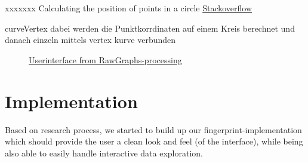 \documentclass[runningheads]{llncs}
\begin{document}
xxxxxxx
Calculating the position of points in a circle
\href{https://stackoverflow.com/questions/5300938/calculating-the-position-of-points-in-a-circle}{Stackoverflow}


curveVertex
dabei werden die Punktkorrdinaten auf einem Kreis berechnet und danach einzeln mittels vertex kurve verbunden



\begin{figure}
    \centering
    \caption{\href{https://rawgraphs.io}{Userinterface from RawGraphs-processing}}
    \label{fig:website-reference}
\end{figure}


\section{Implementation}
Based on research process, we started to build up our fingerprint-implementation which should provide the user a clean look and feel (of the interface), while being also able to easily handle interactive data exploration.
\end{document}
